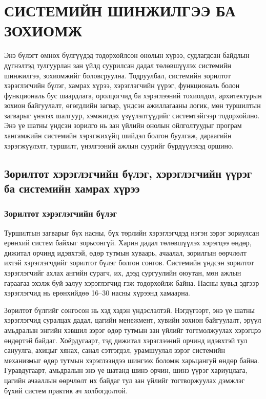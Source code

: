 ﻿\chapter{СИСТЕМИЙН ШИНЖИЛГЭЭ БА ЗОХИОМЖ}

Энэ бүлэгт өмнөх бүлгүүдэд тодорхойлсон онолын хүрээ, судлагдсан байдлын дүгнэлтэд тулгуурлан зан үйлд суурилсан дадал төлөвшүүлэх системийн шинжилгээ, зохиомжийг боловсруулна. Тодруулбал, системийн зорилтот хэрэглэгчийн бүлэг, хамрах хүрээ, хэрэглэгчийн үүрэг, функциональ болон функциональ бус шаардлага, оролцогчид ба хэрэглээний тохиолдол, архитектурын зохион байгуулалт, өгөгдлийн загвар, үндсэн ажиллагааны логик, мөн туршилтын загварыг үнэлэх шалгуур, хэмжигдэх үзүүлэлтүүдийг системтэйгээр тодорхойлно. Энэ үе шатны үндсэн зорилго нь зан үйлийн онолын ойлголтуудыг програм хангамжийн системийн хэрэгжихүйц шийдэл болгон буулгаж, дараагийн хэрэгжүүлэлт, туршилт, үнэлгээний ажлын суурийг бүрдүүлэхэд оршино.

\section{Зорилтот хэрэглэгчийн бүлэг, хэрэглэгчийн үүрэг ба системийн хамрах хүрээ}

\subsection{Зорилтот хэрэглэгчийн бүлэг}

Туршилтын загварыг бүх насны, бүх төрлийн хэрэглэгчдэд нэгэн зэрэг зориулсан ерөнхий систем байхыг зорьсонгүй. Харин дадал төлөвшүүлэх хэрэгцээ өндөр, дижитал орчинд идэвхтэй, өдөр тутмын хуваарь, ачаалал, зорилгын өөрчлөлт ихтэй хэрэглэгчдийг зорилтот бүлэг болгон сонгов. Системийн үндсэн зорилтот хэрэглэгчийг ахлах ангийн сурагч, их, дээд сургуулийн оюутан, мөн ажлын гараагаа эхэлж буй залуу хэрэглэгчид гэж тодорхойлж байна. Насны хувьд эдгээр хэрэглэгчид нь ерөнхийдөө 16--30 насны хүрээнд хамаарна.

Зорилтот бүлгийг сонгосон нь хэд хэдэн үндэслэлтэй. Нэгдүгээрт, энэ үе шатны хэрэглэгчид суралцах дадал, цагийн менежмент, хувийн зохион байгуулалт, эрүүл амьдралын энгийн хэвшил зэрэг өдөр тутмын зан үйлийг тогтмолжуулах хэрэгцээ өндөртэй байдаг. Хоёрдугаарт, тэд дижитал хэрэглээний орчинд идэвхтэй тул сануулга, ахицыг хянах, санал сэтгэгдэл, урамшуулал зэрэг системийн механизмыг өдөр тутмын хэрэглээндээ шингээх боломж харьцангуй өндөр байна. Гуравдугаарт, амьдралын энэ үе шатанд шинэ орчин, шинэ үүрэг хариуцлага, цагийн ачааллын өөрчлөлт их байдаг тул зан үйлийг тогтворжуулах дэмжлэг бүхий систем практик ач холбогдолтой.

